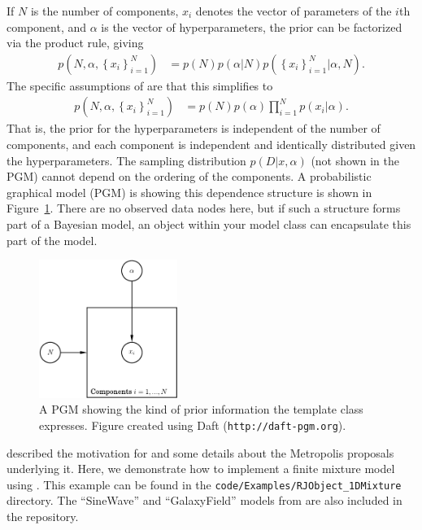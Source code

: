 \documentclass[article, nojss]{jss}
\begin{document}
If $N$ is the number of components, $x_i$ denotes the vector of parameters
of the $i$th component, and $\alpha$ is the vector of hyperparameters, the prior
can be factorized via the product rule, giving
\begin{align}
p\left(N, \alpha, \left\{x_i\right\}_{i=1}^N\right)
&= p(N)p(\alpha | N)p\left(\left\{x_i\right\}_{i=1}^N | \alpha, N\right).
\end{align}
The specific assumptions of  are that this simplifies to
\begin{align}
p\left(N, \alpha, \left\{x_i\right\}_{i=1}^N\right)
&= p(N)p(\alpha)
\prod_{i=1}^N
p\left(x_i | \alpha\right).\label{eqn:rjobject}
\end{align}
That is, the prior for the hyperparameters is independent of the number of
components, and each component is independent and identically
distributed given the hyperparameters. The sampling distribution
$p(D | x, \alpha)$ (not shown in the PGM)
cannot depend on the ordering of the components.
A probabilistic graphical model (PGM) is showing this dependence
structure is shown in Figure~\ref{fig:rjobject_pgm}. There are no observed
data nodes here, but if such a structure forms part of a
Bayesian model, an  object within your model class
can encapsulate this part of the model.

\begin{figure}[ht!]
\begin{center}
\hspace*{-2cm}\includegraphics[width=0.4\textwidth]{figures/rjobject_pgm.pdf}
\caption{A PGM showing the kind of prior information the 
template class expresses.
Figure created using Daft ({\tt http://daft-pgm.org}).\label{fig:rjobject_pgm}}
\end{center}
\end{figure}

\citet{brewer2014inference}
described the motivation for  and some details
about the Metropolis proposals underlying it. Here, we demonstrate how to
implement a finite mixture model using .
This example can be found in the
{\tt code/Examples/RJObject\_1DMixture}
directory. The ``SineWave'' and ``GalaxyField'' models
from \citet{brewer2014inference}
are also included in the  repository.
\end{document}
